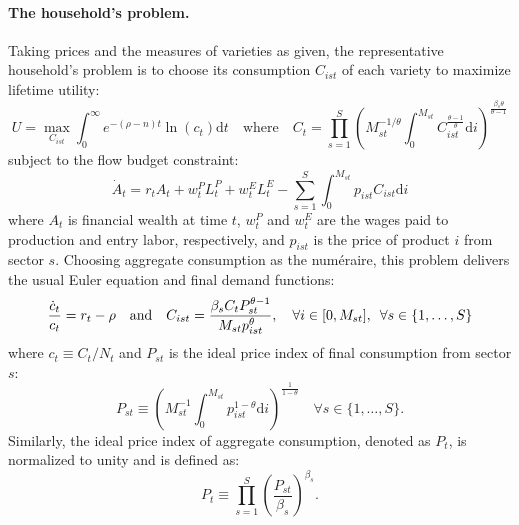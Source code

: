 \documentclass[12pt]{article}
\newcommand{\smallquad}{\hspace{0.5em}}
\begin{document}
\paragraph{The household's problem.} Taking prices and the measures of varieties as given, the representative household's problem is to choose its consumption $C_{ist}$ of each variety to maximize lifetime utility:
\begin{equation*}
    U = \max_{C_{ist}} \int_0^{\infty} e^{-(\rho - n) t} \ln(c_t) \text{d}t \quad \text{where} \quad C_t = \prod_{s = 1}^S \left(M_{st}^{-1 / \theta} \int_0^{M_{st}} C_{ist}^{\frac{\theta - 1}{\theta}} \text{d}i\right)^{\frac{\beta_s \theta}{\theta - 1}}
\end{equation*}
subject to the flow budget constraint:
\begin{equation*}
    \dot{A}_t = r_t A_t + w_t^P L_t^P + w_t^E L_t^E - \sum_{s = 1}^S \int_0^{M_{st}} p_{ist} C_{ist} \text{d}i
\end{equation*}
where $A_t$ is financial wealth at time $t$, $w_t^P$ and $w_t^E$ are the wages paid to production and entry labor, respectively, and $p_{ist}$ is the price of product $i$ from sector $s$. Choosing aggregate consumption as the num\'eraire, this problem delivers the usual Euler equation and final demand functions:
\begin{equation*}
    \frac{\dot{c}_t}{c_t} = r_t - \rho \quad \text{and} \quad C_{ist} = \frac{\beta_s C_t P_{st}^{\theta - 1}}{M_{st} p_{ist}^{\theta}}, \quad \forall i \in [0, M_{st}], \smallquad \forall s \in \{1, \ldots, S\}
\end{equation*}
where $c_t \equiv C_t / N_t$ and $P_{st}$ is the ideal price index of final consumption from sector $s$:
\begin{equation*}
    P_{st} \equiv \left(M_{st}^{-1} \int_0^{M_{st}} p_{ist}^{1 - \theta} \text{d}i\right)^{\frac{1}{1 - \theta}} \quad \forall s \in \{1, \ldots, S\}.
\end{equation*}
Similarly, the ideal price index of aggregate consumption, denoted as $P_t$, is normalized to unity and is defined as:
\begin{equation*}
    P_t \equiv \prod_{s = 1}^S \left(\frac{P_{st}}{\beta_s}\right)^{\beta_s}.
\end{equation*}
\end{document}
